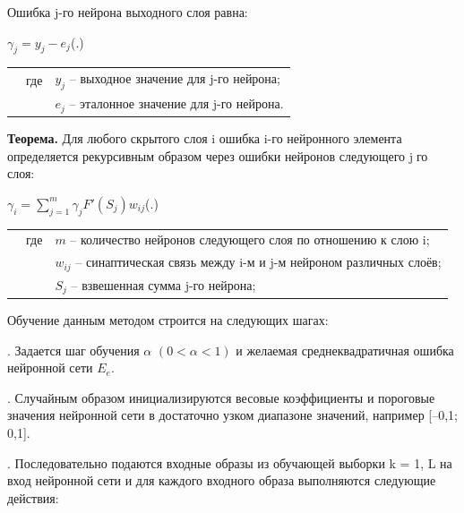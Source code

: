 	\par \redline Ошибка j-го нейрона выходного слоя равна:
	
	\formulaspace \par \redline 
	$\gamma_{j} = y_{j} - e_{j} $\hfill (\thechaptercntr .\theformulacntr) \redline
	\formulaspace \addtocounter{formulacntr}{1}
	
	\begin{tabular}{p{}p{}p{}}
		& где  & $y_{j}$ {--} выходное значение для j-го нейрона; \\
		&      & $e_{j}$ {--} эталонное значение для j-го нейрона. \\
	\end{tabular}
	
	\par \redline \textbf{Теорема.} Для любого скрытого слоя i ошибка i-го нейронного элемента определяется рекурсивным образом через ошибки нейронов следующего jго слоя:
	
	\formulaspace \par \redline 
	$\gamma_{i} =  \sum \limits _{j=1}^{m} \gamma_{j} F'(S_{j}) w_{ij}$\hfill (\thechaptercntr .\theformulacntr) \redline
	\formulaspace \addtocounter{formulacntr}{1}
	
	\begin{tabular}{p{}p{}p{}}
		& где  & $m$ {--} количество нейронов следующего слоя по отношению к слою i; \\
		&      & $w_{ij}$ {--} синаптическая связь между i-м и j-м нейроном различных слоёв; \\
		&      & $S_{j}$ {--} взвешенная сумма j-го нейрона; \\
	\end{tabular}
	
	\par \redline Обучение данным методом строится на следующих шагах:
	
	\par {}. Задается шаг обучения $\alpha$  $(0 < \alpha < 1)$ и желаемая среднеквадратичная ошибка нейронной сети $E_e$.
	\par {}. Случайным образом инициализируются весовые коэффициенты и пороговые значения нейронной сети в достаточно узком диапазоне значений, например [–0,1; 0,1].
	\par {}. Последовательно подаются входные образы из обучающей выборки k = 1, L на вход нейронной сети и для каждого входного образа
	выполняются следующие действия:
	
